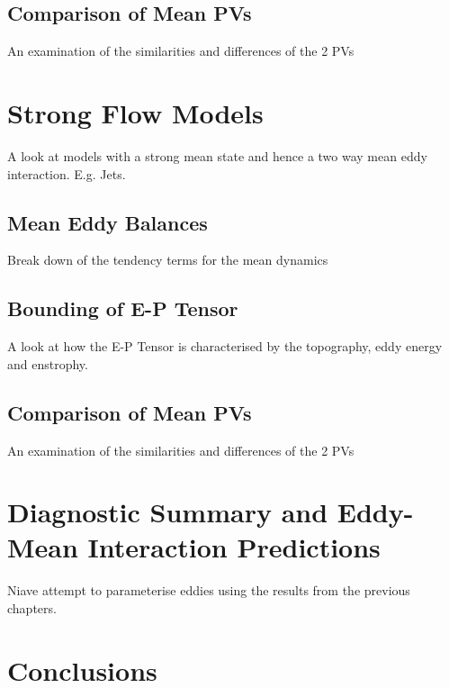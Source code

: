 \documentclass[10pt,a4paper]{article}
\begin{document}
\subsection{Comparison of Mean PVs}

An examination of the similarities and differences
of the 2 PVs

\section{Strong Flow Models}

A look at models with a strong mean state and hence
a two way mean eddy interaction. E.g. Jets.

\subsection{Mean Eddy Balances}

Break down of the tendency terms for the mean
dynamics

\subsection{Bounding of E-P Tensor}

A look at how the E-P Tensor is characterised by
the topography, eddy energy and enstrophy.

\subsection{Comparison of Mean PVs}

An examination of the similarities and differences
of the 2 PVs

\section{Diagnostic Summary and Eddy-Mean Interaction Predictions}

Niave attempt to parameterise eddies using the 
results from the previous chapters.

\section{Conclusions}
\end{document}
